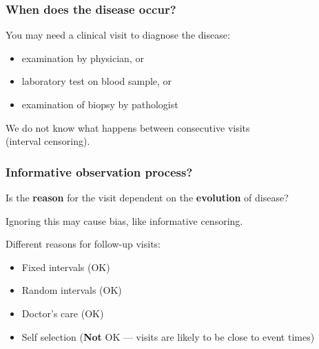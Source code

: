 \begin{frame}
  \frametitle{When does the disease occur?}

  You may need a \alert{clinical visit} to diagnose the disease:
  \begin{itemize}[<+->]
    \item examination by physician, or
    \item laboratory test on blood sample, or
    \item examination of biopsy by pathologist
  \end{itemize}
  \pause
  We do not know what happens between consecutive visits\\ (interval
  censoring).

\end{frame}

\begin{frame}
  \frametitle{Informative observation process?}

  Is the \textbf{reason} for the visit dependent on the \textbf{evolution}
  of disease?

  \pause
  Ignoring this may cause bias, like informative censoring.

  \pause
  Different reasons for follow-up visits:
  \begin{itemize}
    \item Fixed intervals (OK)
    \item Random intervals (OK)
    \item Doctor's care (OK)
    \item Self selection (\textbf{Not} OK --- visits are likely to be
      close to event times)
  \end{itemize}

\end{frame}



